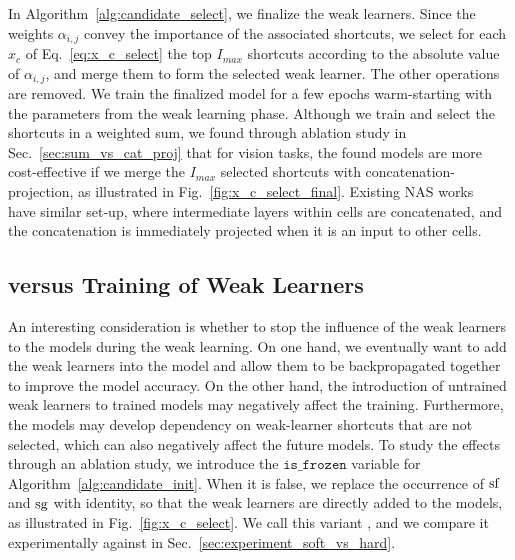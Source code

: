 In Algorithm~\ref{alg:candidate_select}, we finalize the weak learners. Since the weights $\alpha_{i,j}$ convey the importance of the associated shortcuts, we select for each $x_c$ of Eq.~\ref{eq:x_c_select} the top $I_{max}$ shortcuts according to the absolute value of $\alpha_{i,j}$, and merge them to form the selected weak learner. The other operations are removed. 
We train the finalized model for a few epochs warm-starting with the parameters from the weak learning phase. 
Although we train and select the shortcuts in a weighted sum, we found through ablation study in Sec.~\ref{sec:sum_vs_cat_proj} that for vision tasks, the found models are more cost-effective if we merge the $I_{max}$ selected shortcuts with concatenation-projection, as illustrated in Fig.~\ref{fig:x_c_select_final}. Existing NAS works~\citep{NASCell,Real2018RegularizedEF,Pham2018EfficientNA,Liu2018DARTSDA} have similar set-up, where intermediate layers within cells are concatenated, and the concatenation is immediately projected when it is an input to other cells. 



\subsection{\petridishhard versus \petridishsoft Training of Weak Learners}
\label{sec:soft_vs_hard}
An interesting consideration is whether to stop the influence of the weak learners to the models during the weak learning. 
On one hand, we eventually want to add the weak learners into the model and allow them to be backpropagated together
to improve the model accuracy.
On the other hand, the introduction of 
untrained weak learners to trained models may negatively affect the training. Furthermore, the models may develop dependency on weak-learner shortcuts 
that are not selected, which can also negatively affect the future models. 
To study the effects through an ablation study, we introduce the $\texttt{is\_frozen}$ variable for Algorithm~\ref{alg:candidate_init}. 
When it is false, we replace the occurrence of $\textrm{sf}$ and $\textrm{sg}$ with identity, so that the weak learners are directly added to the models, 
as illustrated in Fig.~\ref{fig:x_c_select}. We call this variant
\petridishsoft, and we compare it experimentally against \petridishhard in Sec.~\ref{sec:experiment_soft_vs_hard}. 











